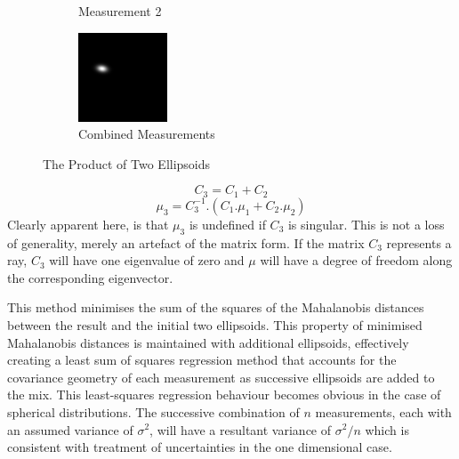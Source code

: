 \documentclass[a4paper, 11pt, titlepage]{article}
\begin{document}
\begin{figure}
\begin{subfigure}{.33\textwidth}
          \caption{Measurement 2}
          \label{fig:uncProdsub2}
        \end{subfigure}
        \begin{subfigure}{.33\textwidth}
          \centering
          \includegraphics[width=.9\linewidth]{images/GaussianLine3.png}
          \caption{Combined Measurements}
          \label{fig:uncProdsub3}
        \end{subfigure}
        \caption{The Product of Two Ellipsoids}
        \label{fig:uncProd}
        \end{figure}

        \begin{equation}
        C_3 = C_1+C_2
        \end{equation}
        \begin{equation}
        \mu_3 = C_3^{-1} . (C_1.\mu_1 + C_2.\mu_2)
        \end{equation}
        Clearly apparent here, is that \(\mu_3\) is undefined if \(C_3\) is singular.
        This is not a loss of generality, merely an artefact of the matrix form.  If the matrix \(C_3\) represents a ray, \(C_3\) will have one eigenvalue of zero and \(\mu\) will have a degree of freedom along the corresponding eigenvector.
        
        This method minimises the sum of the squares of the Mahalanobis distances between the result and the initial two ellipsoids.  This property of minimised Mahalanobis distances is maintained with additional ellipsoids, effectively creating a least sum of squares regression method that accounts for the covariance geometry of each measurement as successive ellipsoids are added to the mix.
        This least-squares regression behaviour becomes obvious in the case of spherical distributions.  The successive combination of \(n\) measurements, each with an assumed variance of \(\sigma^2\), will have a resultant variance of \(\sigma^2/n\) which is consistent with treatment of uncertainties in the one dimensional case.
\end{document}
